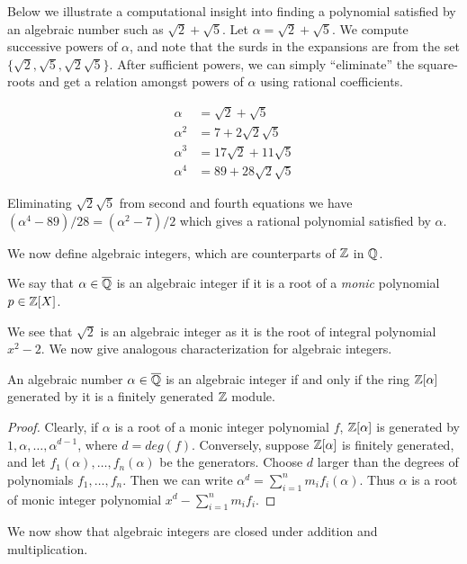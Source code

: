 \documentclass[11pt]{article}
\begin{document}
Below we illustrate a computational insight into finding a polynomial satisfied by an algebraic number such
as $\sqrt{2}+\sqrt{5}$. Let $\alpha=\sqrt{2}+\sqrt{5}$. We compute successive powers of $\alpha$, and note that
the surds in the expansions are from the set $\{\sqrt{2},\sqrt{5}, \sqrt{2}\sqrt{5}\}$. After sufficient powers,
we can simply ``eliminate'' the square-roots and get a relation amongst powers of $\alpha$ using rational coefficients.

\begin{align*}
\alpha &= \sqrt{2} + \sqrt{5} \\
\alpha^2 &= 7 + 2\sqrt{2}\sqrt{5} \\
\alpha^3 &= 17\sqrt{2} + 11\sqrt{5} \\
\alpha^4 &= 89 + 28\sqrt{2}\sqrt{5}
\end{align*}

Eliminating $\sqrt{2}\sqrt{5}$ from second and fourth equations we have $(\alpha^4 - 89)/28=(\alpha^2-7)/2$ which
gives a rational polynomial satisfied by $\alpha$.

We now define algebraic integers, which are counterparts of $\mathbb{Z}$ in $\mathbb{Q}$.
\begin{definition}\label{defn:alg-integer}
We say that $\alpha\in \overline{\mathbb{Q}}$ is an algebraic integer if it is a root of a {\em monic} polynomial
$p\in \mathbb{Z}[X]$.
\end{definition}
We see that $\sqrt{2}$ is an algebraic integer as it is the root of integral polynomial $x^2 - 2$. We now
give analogous characterization for algebraic integers.

\begin{lemma}\label{lem:alg-integers-module}
An algebraic number $\alpha\in \overline{\mathbb{Q}}$ is an algebraic integer if and only if the ring $\mathbb{Z}[\alpha]$
generated by it is a finitely generated $\mathbb{Z}$ module.
\end{lemma}
\begin{proof}
Clearly, if $\alpha$ is a root of a monic integer polynomial $f$, $\mathbb{Z}[\alpha]$ is generated by $1,\alpha,\ldots,\alpha^{d-1}$,
where $d=deg(f)$. Conversely, suppose $\mathbb{Z}[\alpha]$ is finitely generated, and let $f_1(\alpha),\ldots,f_n(\alpha)$
be the generators. Choose $d$ larger than the degrees of polynomials $f_1,\ldots,f_n$. Then we can write
$\alpha^d = \sum_{i=1}^n m_if_i(\alpha)$. Thus $\alpha$ is a root of monic integer polynomial $x^d-\sum_{i=1}^n m_i f_i$.
\end{proof}

We now show that algebraic integers are closed under addition and multiplication.
\end{document}
